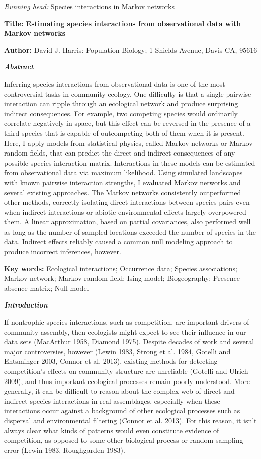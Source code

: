 \documentclass[12pt,]{article}
\date{}
\begin{document}
\begin{spacing}{1.9}
\begin{flushleft}
\emph{Running head:} Species interactions in Markov networks

\textbf{Title: Estimating species interactions from observational data
with Markov networks}

\textbf{Author:} David J. Harris: Population Biology; 1 Shields Avenue,
Davis CA, 95616

\textbf{\emph{Abstract}}

Inferring species interactions from observational data is one of the
most controversial tasks in community ecology. One difficulty is that a
single pairwise interaction can ripple through an ecological network and
produce surprising indirect consequences. For example, two competing
species would ordinarily correlate negatively in space, but this effect
can be reversed in the presence of a third species that is capable of
outcompeting both of them when it is present. Here, I apply models from
statistical physics, called Markov networks or Markov random fields,
that can predict the direct and indirect consequences of any possible
species interaction matrix. Interactions in these models can be
estimated from observational data via maximum likelihood. Using
simulated landscapes with known pairwise interaction strengths, I
evaluated Markov networks and several existing approaches. The Markov
networks consistently outperformed other methods, correctly isolating
direct interactions between species pairs even when indirect
interactions or abiotic environmental effects largely overpowered them.
A linear approximation, based on partial covariances, also performed
well as long as the number of sampled locations exceeded the number of
species in the data. Indirect effects reliably caused a common null
modeling approach to produce incorrect inferences, however.

\textbf{Key words:} Ecological interactions; Occurrence data; Species
associations; Markov network; Markov random field; Ising model;
Biogeography; Presence--absence matrix; Null model

\textbf{\emph{Introduction}}

If nontrophic species interactions, such as competition, are important
drivers of community assembly, then ecologists might expect to see their
influence in our data sets (MacArthur 1958, Diamond 1975). Despite
decades of work and several major controversies, however (Lewin 1983,
Strong et al. 1984, Gotelli and Entsminger 2003, Connor et al. 2013),
existing methods for detecting competition's effects on community
structure are unreliable (Gotelli and Ulrich 2009), and thus important
ecological processes remain poorly understood. More generally, it can be
difficult to reason about the complex web of direct and indirect species
interactions in real assemblages, especially when these interactions
occur against a background of other ecological processes such as
dispersal and environmental filtering (Connor et al. 2013). For this
reason, it isn't always clear what kinds of patterns would even
constitute evidence of competition, as opposed to some other biological
process or random sampling error (Lewin 1983, Roughgarden 1983).


\end{flushleft}
\end{spacing}
\end{document}

